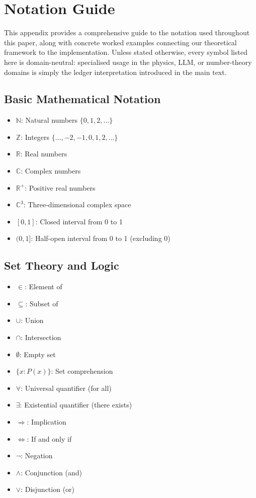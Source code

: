 \appendix
\section{Notation Guide}
\label{app:notation}

This appendix provides a comprehensive guide to the notation used throughout this paper, along with concrete worked examples connecting our theoretical framework to the implementation. Unless stated otherwise, every symbol listed here is domain-neutral: specialised usage in the physics, LLM, or number-theory domains is simply the ledger interpretation introduced in the main text.

\subsection{Basic Mathematical Notation}
\begin{itemize}
\item $\mathbb{N}$: Natural numbers $\{0, 1, 2, \ldots\}$
\item $\mathbb{Z}$: Integers $\{\ldots, -2, -1, 0, 1, 2, \ldots\}$
\item $\mathbb{R}$: Real numbers
\item $\mathbb{C}$: Complex numbers
\item $\mathbb{R}^+$: Positive real numbers
\item $\mathbb{C}^3$: Three-dimensional complex space
\item $[0,1]$: Closed interval from 0 to 1
\item $(0,1]$: Half-open interval from 0 to 1 (excluding 0)
\end{itemize}

\subsection{Set Theory and Logic}
\begin{itemize}
\item $\in$: Element of
\item $\subseteq$: Subset of
\item $\cup$: Union
\item $\cap$: Intersection
\item $\emptyset$: Empty set
\item $\{x : P(x)\}$: Set comprehension
\item $\forall$: Universal quantifier (for all)
\item $\exists$: Existential quantifier (there exists)
\item $\Rightarrow$: Implication
\item $\Leftrightarrow$: If and only if
\item $\neg$: Negation
\item $\wedge$: Conjunction (and)
\item $\vee$: Disjunction (or)
\end{itemize}

